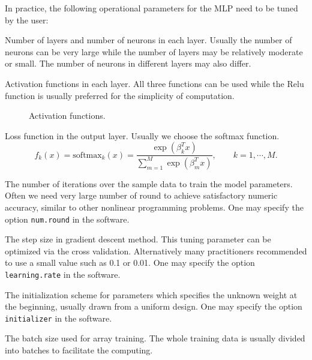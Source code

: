 \documentclass[]{article}
\begin{document}
In practice, the following operational parameters for the MLP need to be tuned by the user:
\begin{description}\label{para}
	\item[Layers] Number of layers and number of neurons in each layer. Usually the number of neurons can be very large while the number of layers may be relatively moderate or small. The number of neurons in different layers may also differ.	
	\item[Activation functions] Activation functions in each layer. All three functions can be used while the Relu function is usually preferred for the simplicity of computation.
	\begin{figure}[htbp]
		\centering                                                      
		\caption{Activation functions.\label{fig:act}} 
		
	\end{figure}
	
	\item[Loss function] Loss function in the output layer. Usually we choose the softmax function.
	\begin{equation}\label{softmax}
	f_k(x)=\mbox{softmax}_k(x)=\frac{\exp(\beta_k^Tx)}{\sum_{m=1}^M \exp(\beta_m^Tx)}, \qquad k=1,\cdots,M.
	\end{equation} 
	\item[Number of round or epoch] The number of iterations over the sample data to train the model parameters. Often we need very large number of round to achieve satisfactory numeric accuracy, similar to other nonlinear programming problems. One may specify the option {\tt num.round} in the software.
	\item[Learning rate] The step size in gradient descent method. This tuning parameter can be optimized via the cross validation. Alternatively many practitioners recommended to use a small value such as 0.1 or 0.01. One may specify the option {\tt learning.rate} in the software.
	\item[Initializer]  The initialization scheme for parameters which specifies the unknown weight at the beginning, usually drawn from a uniform design. One may specify the option {\tt initializer} in the software.
	\item[Array batch size] The batch size used for array training. The whole training data is usually divided into batches to facilitate the computing.
	
\end{description}
\end{document}
